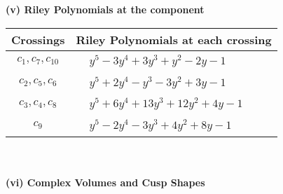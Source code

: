 \documentclass[1p]{elsarticle_modified}
\theoremstyle{definition}
\begin{document}
\newpage\renewcommand{\arraystretch}{1}
\flushleft \textbf{(v) Riley Polynomials at the component}\newline \\
\begin{tabular}{m{50pt}|m{274pt}}
Crossings & \hspace{64pt}Riley Polynomials at each crossing \\
\hline $$\begin{aligned}c_{1},c_{7},c_{10}\end{aligned}$$&$\begin{aligned}
&y^5-3 y^4+3 y^3+y^2-2 y-1
\end{aligned}$\\
\hline $$\begin{aligned}c_{2},c_{5},c_{6}\end{aligned}$$&$\begin{aligned}
&y^5+2 y^4- y^3-3 y^2+3 y-1
\end{aligned}$\\
\hline $$\begin{aligned}c_{3},c_{4},c_{8}\end{aligned}$$&$\begin{aligned}
&y^5+6 y^4+13 y^3+12 y^2+4 y-1
\end{aligned}$\\
\hline $$\begin{aligned}c_{9}\end{aligned}$$&$\begin{aligned}
&y^5-2 y^4-3 y^3+4 y^2+8 y-1
\end{aligned}$\\
\hline
\end{tabular}\\~\\
\newpage\flushleft \textbf{(vi) Complex Volumes and Cusp Shapes}
\end{document}
